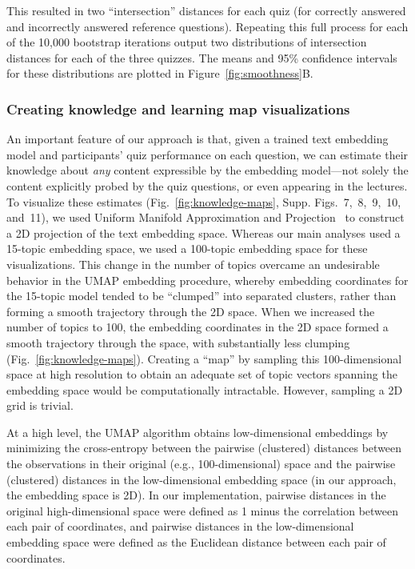 \documentclass[10pt]{article}
\newcommand{\individualKnowledgeMapsA}{7}
\newcommand{\individualKnowledgeMapsB}{8}
\newcommand{\individualKnowledgeMapsC}{9}
\newcommand{\individualLearningMapsA}{10}
\newcommand{\individualLearningMapsB}{11}
\begin{document}
This resulted in two ``intersection'' distances for each quiz (for correctly
answered and incorrectly answered reference questions). Repeating this full
process for each of the 10,000 bootstrap iterations output two distributions of
intersection distances for each of the three quizzes. The means and 95\%
confidence intervals for these distributions are plotted in
Figure~\ref{fig:smoothness}B.

\subsubsection*{Creating knowledge and learning map visualizations}\label{subsec:knowledge-maps}

An important feature of our approach is that, given a trained text embedding
model and participants' quiz performance on each question, we can estimate
their knowledge about \textit{any} content expressible by the embedding
model---not solely the content explicitly probed by the quiz questions, or even
appearing in the lectures. To visualize these estimates
(Fig.~\ref{fig:knowledge-maps}, Supp.
Figs.~\individualKnowledgeMapsA,~\individualKnowledgeMapsB,~\individualKnowledgeMapsC,~\individualLearningMapsA,
and~\individualLearningMapsB), we used Uniform Manifold Approximation and
Projection~\citep[UMAP; ][]{McInEtal18a, McInEtal18b} to construct a 2D
projection of the text embedding space. Whereas our main analyses used a
15-topic embedding space, we used a 100-topic embedding space for these
visualizations. This change in the number of topics overcame an undesirable
behavior in the UMAP embedding procedure, whereby embedding coordinates for the
15-topic model tended to be ``clumped'' into separated clusters, rather than
forming a smooth trajectory through the 2D space. When we increased the number
of topics to 100, the embedding coordinates in the 2D space formed a smooth
trajectory through the space, with substantially less clumping
(Fig.~\ref{fig:knowledge-maps}). Creating a ``map'' by sampling this
100-dimensional space at high resolution to obtain an adequate set of topic
vectors spanning the embedding space would be computationally intractable.
However, sampling a 2D grid is trivial.

At a high level, the UMAP algorithm obtains low-dimensional embeddings by
minimizing the cross-entropy between the pairwise (clustered) distances between
the observations in their original (e.g., 100-dimensional) space and the
pairwise (clustered) distances in the low-dimensional embedding space (in our
approach, the embedding space is 2D). In our implementation, pairwise distances
in the original high-dimensional space were defined as 1 minus the correlation
between each pair of coordinates, and pairwise distances in the low-dimensional
embedding space were defined as the Euclidean distance between each pair of
coordinates.
\end{document}
